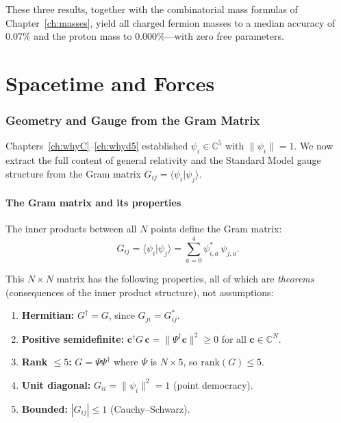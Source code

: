 \documentclass[12pt]{article}
\theoremstyle{remark}
\theoremstyle{definition}
\begin{document}
These three results, together with the combinatorial mass formulas of
Chapter~\ref{ch:masses}, yield all charged fermion masses to a median
accuracy of $0.07\%$ and the proton mass to $0.000\%$---with zero
free parameters.


\part{Spacetime and Forces}


\section{Geometry and Gauge from the Gram Matrix}
\label{ch:geometry}

Chapters~\ref{ch:whyC}--\ref{ch:whyd5} established $\psi_i \in \mathbb{C}^5$ with $\|\psi_i\| = 1$. We now extract the full content of general relativity and the Standard Model gauge structure from the Gram matrix $G_{ij} = \langle\psi_i|\psi_j\rangle$.

\subsection{The Gram matrix and its properties}

The inner products between all $N$ points define the Gram matrix:
\begin{equation}
G_{ij} = \langle\psi_i|\psi_j\rangle = \sum_{a=0}^{4} \psi^*_{i,a}\,\psi_{j,a}.
\end{equation}

This $N \times N$ matrix has the following properties, all of which are \emph{theorems} (consequences of the inner product structure), not assumptions:

\begin{enumerate}[label=(\alph*)]
\item \textbf{Hermitian:} $G^\dagger = G$, since $G_{ji} = G^*_{ij}$.
\item \textbf{Positive semidefinite:} $\mathbf{c}^\dagger G\,\mathbf{c} = \|\Psi^\dagger\mathbf{c}\|^2 \geq 0$ for all $\mathbf{c} \in \mathbb{C}^N$.
\item \textbf{Rank $\leq 5$:} $G = \Psi\Psi^\dagger$ where $\Psi$ is $N \times 5$, so $\text{rank}(G) \leq 5$.
\item \textbf{Unit diagonal:} $G_{ii} = \|\psi_i\|^2 = 1$ (point democracy).
\item \textbf{Bounded:} $|G_{ij}| \leq 1$ (Cauchy--Schwarz).
\end{enumerate}
\end{document}
